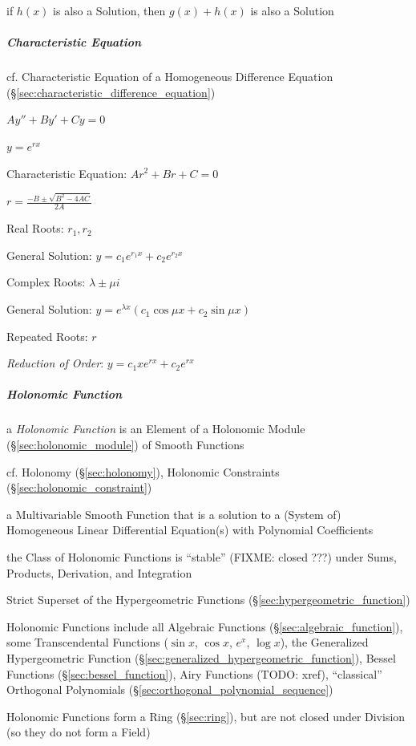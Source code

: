 {if $h(x)$ is also a Solution, then $g(x) + h(x)$ is also a Solution



\subparagraph{Characteristic Equation}\label{sec:characteristic_equation}\hfill

cf. Characteristic Equation of a Homogeneous Difference Equation
(\S\ref{sec:characteristic_difference_equation})

$A y'' + B y' + C y = 0$

$y = e^{rx}$

Characteristic Equation: $Ar^2 + Br + C = 0$

$r = \frac{-B \pm \sqrt{B^2 - 4AC}}{2A}$

Real Roots: $r_1, r_2$

General Solution: $y = c_1e^{r_1x} + c_2e^{r_2x}$

Complex Roots: $\lambda \pm \mu i$

General Solution: $y = e^{\lambda x}(c_1 \cos\mu{x} + c_2 \sin\mu{x})$

Repeated Roots: $r$

\emph{Reduction of Order}: $y = c_1 x e^{rx} + c_2 e^{rx}$



\subparagraph{Holonomic Function}\label{sec:holonomic_function}\hfill

a \emph{Holonomic Function} is an Element of a Holonomic Module
(\S\ref{sec:holonomic_module}) of Smooth Functions

\fist cf. Holonomy (\S\ref{sec:holonomy}), Holonomic Constraints
(\S\ref{sec:holonomic_constraint})

a Multivariable Smooth Function that is a solution to a (System of) Homogeneous
Linear Differential Equation(s) with Polynomial Coefficients

the Class of Holonomic Functions is ``stable'' (FIXME: closed ???) under Sums,
Products, Derivation, and Integration

Strict Superset of the Hypergeometric Functions
(\S\ref{sec:hypergeometric_function})

Holonomic Functions include all Algebraic Functions
(\S\ref{sec:algebraic_function}), some Transcendental Functions ($\sin x$,
$\cos x$, $e^x$, $\log x$), the Generalized Hypergeometric Function
(\S\ref{sec:generalized_hypergeometric_function}), Bessel Functions
(\S\ref{sec:bessel_function}), Airy Functions (TODO: xref), ``classical''
Orthogonal Polynomials (\S\ref{sec:orthogonal_polynomial_sequence})

Holonomic Functions form a Ring (\S\ref{sec:ring}), but are not closed under
Division (so they do not form a Field)



}
